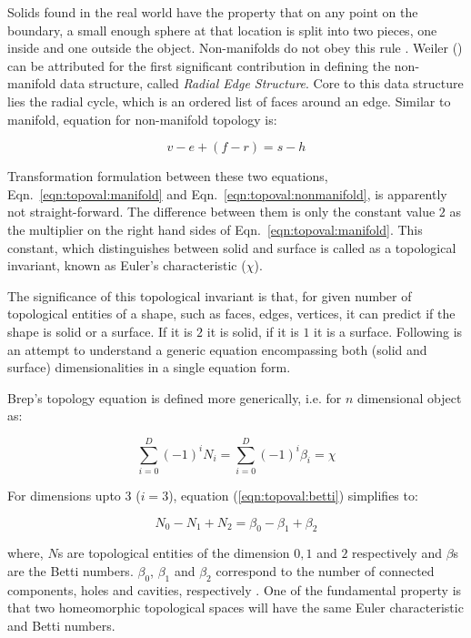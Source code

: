 Solids found in the real world have the property that on any point on the boundary, a small enough sphere at that location is split into two pieces, one inside and one outside the object. Non-manifolds do not obey this rule \cite{Krishnamurti2002}. Weiler (\cite{Weiler1986}) can be attributed for the first significant contribution in defining the non-manifold data structure, called {\em Radial Edge Structure}. Core to this data structure lies the radial cycle, which is an ordered list of faces around an edge.  Similar to manifold, equation for non-manifold topology \cite{Yamaguchi2002} is: 

\begin{equation}
v - e + (f - r) = s - h
\label{eqn:topoval:nonmanifold}
\end{equation}

Transformation formulation between these two equations, Eqn.~\ref{eqn:topoval:manifold} and Eqn.~\ref{eqn:topoval:nonmanifold}, is apparently not straight-forward. The difference between them is only the constant value $2$ as the multiplier on the right hand sides of Eqn.~\ref{eqn:topoval:manifold}. This constant, which distinguishes between solid and surface is called as a topological invariant, known as Euler's characteristic ($\chi$). 

The significance of this topological invariant is that, for given number of topological entities of a shape, such as faces, edges, vertices, it can predict if the shape is solid or a surface. If it is $2$ it is solid, if it is $1$ it is a surface. Following is an attempt to understand a generic equation encompassing both (solid and surface) dimensionalities in a single equation form.

Brep's topology equation is defined more generically, i.e. for $n$ dimensional object as:

\begin{equation}
\sum_{i=0 }^D(-1)^{i} N_{i}= \sum_{i=0}^D(-1)^{i} \beta_{i} = \chi 
\label{eqn:topoval:betti}
\end{equation}

For dimensions upto 3 ($i=3$), equation (\ref{eqn:topoval:betti}) simplifies to:

\begin{equation}
N_{0}-N_{1}+N_{2}= \beta_{0} -\beta_{1} + \beta_{2}
\label{eqn:topoval:betti3}
\end{equation}

where, $N$s are topological entities of the dimension $0,1$ and $2$ respectively and $\beta$s are the Betti numbers. $\beta_{0}$, $\beta_{1}$ and $\beta_{2}$ correspond to  the number of connected components, holes and cavities, respectively \cite{Sequin}. One of the fundamental property is that two homeomorphic topological spaces will have the same Euler characteristic and Betti numbers.

